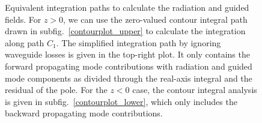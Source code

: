 \documentclass[preprint,aps,pra,onecolumn]{revtex4-1} %
\begin{document}
\begin{figure}
\begin{minipage}{.91\linewidth}
\centering
{}
\end{minipage}
\par\medskip
\begin{minipage}{.91\linewidth}
\centering
{}
\end{minipage}
\caption{Equivalent integration paths to calculate the radiation and guided fields. For $ z>0 $, we can use the zero-valued contour integral path drawn in subfig.~\ref{contourplot_upper} to calculate the integration along path $ C_1 $. The simplified integration path by ignoring waveguide losses is given in the top-right plot. It only contains the forward propagating mode contributions with radiation and guided mode components as divided through the real-axis integral and the residual of the pole. For the $ z<0 $ case, the contour integral analysis is given in subfig.~\ref{contourplot_lower}, which only includes the backward propagating mode contributions.}
\label{fig:integralpath}
\end{figure}
\end{document}
